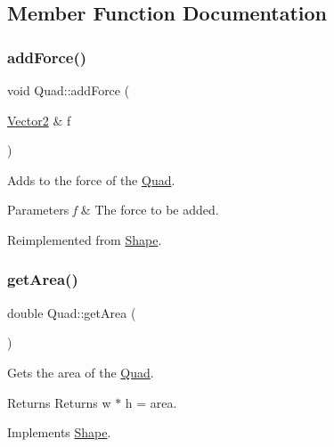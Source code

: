 \subsection{Member Function Documentation}
\mbox{\label{class_quad_a1f0a30842d8b35a8402baa8bb76384ad}} 
\subsubsection{\texorpdfstring{addForce()}{addForce()}}
{\footnotesize\ttfamily void Quad\+::add\+Force (\begin{DoxyParamCaption}\item[{\mbox{\hyperlink{struct_vector2}{Vector2}} \&}]{f }\end{DoxyParamCaption})\hspace{0.3cm}{\ttfamily [virtual]}}



Adds to the force of the \mbox{\hyperlink{class_quad}{Quad}}. 


\begin{DoxyParams}{Parameters}
{\em f} & The force to be added. \\
\hline
\end{DoxyParams}


Reimplemented from \mbox{\hyperlink{class_shape_a2fcffede033450a219278164b864e8a3}{Shape}}.

\mbox{\label{class_quad_abd7230629190e09ee3bdadefb6784320}} 
\subsubsection{\texorpdfstring{getArea()}{getArea()}}
{\footnotesize\ttfamily double Quad\+::get\+Area (\begin{DoxyParamCaption}{ }\end{DoxyParamCaption})\hspace{0.3cm}{\ttfamily [virtual]}}



Gets the area of the \mbox{\hyperlink{class_quad}{Quad}}. 

\begin{DoxyReturn}{Returns}
Returns w $\ast$ h = area. 
\end{DoxyReturn}


Implements \mbox{\hyperlink{class_shape_acec2178598665e96b85f1ac6a13a47b9}{Shape}}.

